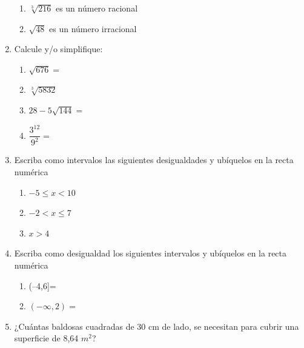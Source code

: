 \documentclass[fleqn,twocolum]{article}
\begin{document}
\begin{enumerate}
\begin{enumerate}
\item $\sqrt[3]{216}$ es un número racional \underline{\hspace*{20pt}}
\item $\sqrt{48}$ es un número irracional \underline{\hspace*{20pt}}
\end{enumerate}
\item Calcule y/o simplifique:
\begin{enumerate}
\item $\sqrt{676}=$ \noanswer
\item $\sqrt[3]{5832}$\noanswer
\item $28-5\sqrt{144}=$\noanswer
\item $\dfrac{3^{12}}{9^{2}}=$\noanswer
\end{enumerate}
\item Escriba como intervalos las siguientes desigualdades y ubíquelos en la recta numérica
\begin{enumerate}
\item $-5\leq x<10$\noanswer
 \newpage
\item $-2<x \leq7$\noanswer
\item $x>4$\noanswer
\end{enumerate}
\item Escriba como desigualdad los siguientes intervalos y ubíquelos en la recta numérica
\begin{enumerate}
\item (--4,6]= \noanswer
\item $(-\infty,2)=$ \noanswer
\end{enumerate}
\item ¿Cuántas baldosas cuadradas de 30 cm de lado, se necesitan para cubrir una superficie de 8,64 $m^{2}$?\noanswer[2in]

\end{enumerate}
\end{document}
